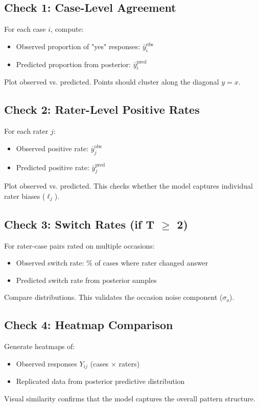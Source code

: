 \documentclass[num-refs]{wiley-article}
\begin{document}
\subsection*{Check 1: Case-Level Agreement}

For each case $i$, compute:
\begin{itemize}
    \item Observed proportion of "yes" responses: $\bar{y}_i^{\text{obs}}$
    \item Predicted proportion from posterior: $\bar{y}_i^{\text{pred}}$
\end{itemize}
Plot observed vs. predicted. Points should cluster along the diagonal $y = x$.

\subsection*{Check 2: Rater-Level Positive Rates}

For each rater $j$:
\begin{itemize}
    \item Observed positive rate: $\bar{y}_j^{\text{obs}}$
    \item Predicted positive rate: $\bar{y}_j^{\text{pred}}$
\end{itemize}
Plot observed vs. predicted. This checks whether the model captures individual rater biases ($\ell_j$).

\subsection*{Check 3: Switch Rates (if T $\geq$ 2)}

For rater-case pairs rated on multiple occasions:
\begin{itemize}
    \item Observed switch rate: \% of cases where rater changed answer
    \item Predicted switch rate from posterior samples
\end{itemize}
Compare distributions. This validates the occasion noise component ($\sigma_o$).

\subsection*{Check 4: Heatmap Comparison}

Generate heatmaps of:
\begin{itemize}
    \item Observed responses $Y_{ij}$ (cases × raters)
    \item Replicated data from posterior predictive distribution
\end{itemize}
Visual similarity confirms that the model captures the overall pattern structure.
\end{document}

